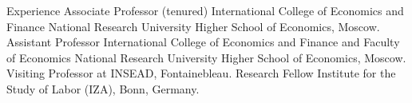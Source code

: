 

\begin{rubric}{Experience}
\entry*[2015--]  Associate Professor (tenured) \newline
                  International College of Economics and Finance \newline
                  National Research University Higher School of Economics, Moscow.
\entry*[2009--2015]  Assistant Professor \newline
                  International College of Economics and Finance and Faculty of Economics \newline
                  National Research University Higher School of Economics, Moscow.
\entry*[Spring 2016] Visiting Professor at INSEAD, Fontainebleau.
\entry*[2013--]  Research Fellow \newline
                  Institute for the Study of Labor (IZA), Bonn, Germany.

\end{rubric}
